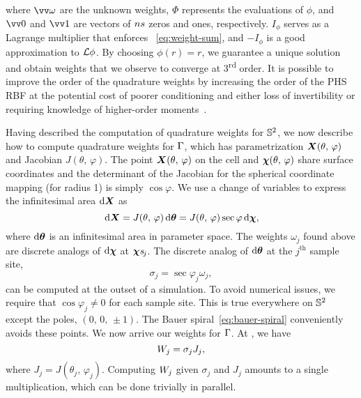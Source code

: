 where $\arr{\omega}$ are the unknown weights, $\Phi$ represents the evaluations of
$\phi$, and $\arr{0}$ and $\arr{1}$ are vectors of $\sample\cardinality$ zeros and ones,
respectively. $I_{\phi}$ serves as a Lagrange multiplier that enforces~%
\eqref{eq:weight-sum}, and $-I_\phi$ is a good approximation to $\mathcal{L}\phi$. By choosing
$\phi(r) = r$, we guarantee a unique solution and obtain weights that we observe to
converge at 3\textsuperscript{rd} order. It is possible to improve the order of the
quadrature weights by increasing the order of the PHS RBF at the potential cost of poorer
conditioning and either loss of invertibility or requiring knowledge of higher-order
moments~\cite{Fuselier:2013coba}.

Having described the computation of quadrature weights for $\mathbb{S}^2$, we now
describe how to compute quadrature weights for $\Gamma$, which has parametrization
$\boldsymbol{X}(\theta,\,\varphi)$ and Jacobian $J(\theta,\,\varphi)$. The point
$\boldsymbol{X}(\theta,\,\varphi)$ on the cell and $\boldsymbol{\chi}(\theta,\,\varphi)$ share surface coordinates
and the determinant of the Jacobian for the spherical coordinate mapping (for radius 1)
is simply $\cos\varphi$.  We use a change of variables to express the infinitesimal area
$\d\X$ as
\begin{equation}\label{eq:quad-cov}
    \d\X
    = J(\theta,\,\varphi)\d\qs
    = J(\theta,\,\varphi)\sec\varphi\d\Xp,
\end{equation}
where $\d\qs$ is an infinitesimal area in parameter space. The weights $\omega_j$ found
above are discrete analogs of $\d\Xp$ at $\Xpsj$. The discrete analog of $\d\qs$ at the
$j^\text{th}$ sample site,
\begin{equation*}
    \sigma_j=\sec\varphi_j\omega_j,
\end{equation*}
can be computed at the outset of a simulation. To avoid numerical issues, we require that
$\cos\varphi_j \neq 0$ for each sample site. This is true everywhere on $\mathbb{S}^2$ except
the poles, $(0,\,0,\,\pm1)$. The Bauer spiral~\eqref{eq:bauer-spiral} conveniently avoids
these points. We now arrive our weights for $\Gamma$. At , we have
\begin{equation}
    \weight[j] = \sigma_j J_j,
\end{equation}
where $J_j = J(\theta_j,\,\varphi_j)$. Computing $\weight[j]$ given $\sigma_j$ and $J_j$
amounts to a single multiplication, which can be done trivially in parallel.

